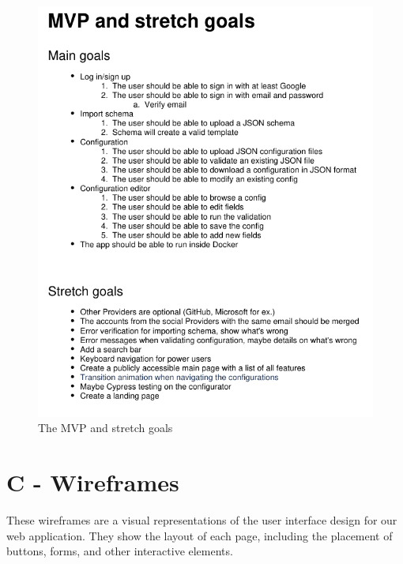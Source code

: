 \begin{figure}[!ht]
\begin{minipage}{1\textwidth}
    \centering
        \includegraphics[width=.9\textwidth]{Figures/appendix/MVP and stretch goals.pdf}
        \caption[MVP and stretch goals]{The MVP and stretch goals}
        \label{requirements:requirements}
    \end{minipage}\hfill
\end{figure}


\chapter*{C - Wireframes}

These wireframes are a visual representations of the user interface design for our web application. They show the layout of each page, including the placement of buttons, forms, and other interactive elements.

\renewcommand{\thefigure}{C.\arabic{figure}}
\setcounter{figure}{0}
\renewcommand{\thetable}{C.\arabic{table}}
\setcounter{table}{0}

